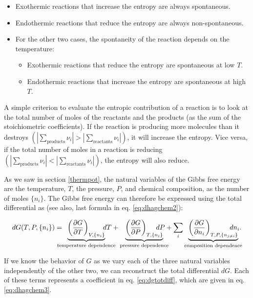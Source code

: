 \documentclass[
  9pt,
]{extbook}
\providecommand{\tightlist}{%
  \setlength{\itemsep}{0pt}\setlength{\parskip}{0pt}}
\theoremstyle{definition}
\theoremstyle{definition}
\theoremstyle{definition}
\theoremstyle{remark}
\begin{document}
\begin{itemize}
\tightlist
\item
  Exothermic reactions that increase the entropy are always spontaneous.
\item
  Endothermic reactions that reduce the entropy are always non-spontaneous.
\item
  For the other two cases, the spontaneity of the reaction depends on the temperature:

  \begin{itemize}
  \tightlist
  \item
    Exothermic reactions that reduce the entropy are spontaneous at low \(T\).
  \item
    Endothermic reactions that increase the entropy are spontaneous at high \(T\).
  \end{itemize}
\end{itemize}

A simple criterion to evaluate the entropic contribution of a reaction is to look at the total number of moles of the reactants and the products (as the sum of the stoichiometric coefficients). If the reaction is producing more molecules than it destroys \(\left( \left| \sum_\text{products} \nu_i \right| > \left| \sum_\text{reactants} \nu_i \right| \right)\), it will increase the entropy. Vice versa, if the total number of moles in a reaction is reducing \(\left( \left| \sum_\text{products} \nu_i \right| < \left| \sum_\text{reactants} \nu_i \right| \right)\), the entropy will also reduce.

As we saw in section \ref{thermpot}, the natural variables of the Gibbs free energy are the temperature, \(T\), the pressure, \(P\), and chemical composition, as the number of moles \(\{n_i\}\). The Gibbs free energy can therefore be expressed using the total differential as (see also, last formula in eq. \eqref{eq:dhagchem2}):

\begin{equation}
dG(T,P,\{n_i\}) = \mkern-18mu \underbrace{\left(\frac{\partial G}{\partial T} \right)_{V,\{n_i\}}}_{\text{temperature dependence}} \mkern-36mu dT + \underbrace{\left(\frac{\partial G}{\partial P} \right)_{T,\{n_i\}}}_{\text{pressure dependence}} \mkern-36mu dP + \sum_i \underbrace{\left(\frac{\partial G}{\partial n_i} \right)_{T,P,\{n_{j \neq i}\}}}_{\text{composition dependence}} \mkern-36mu dn_i.
\label{eq:dgtotdiff}
\end{equation}

If we know the behavior of \(G\) as we vary each of the three natural variables independently of the other two, we can reconstruct the total differential \(dG\). Each of these terms represents a coefficient in eq. \eqref{eq:dgtotdiff}, which are given in eq. \eqref{eq:dhagchem3}.
\end{document}
